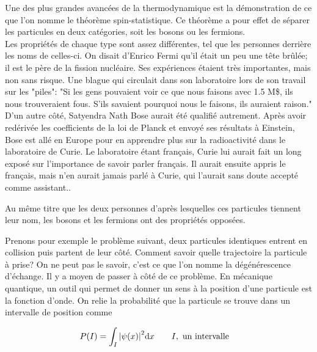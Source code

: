 

Une des plus grandes avancées de la thermodynamique est la démonstration de ce
que l'on nomme le théorème spin-statistique. Ce théorème a pour effet de
séparer les particules en deux catégories, soit les bosons ou les fermions.\\

Les propriétés de chaque type sont assez différentes, tel que les personnes
derrière les noms de celles-ci. On disait d'Enrico Fermi qu'il était un peu
une tête brûlée; il est le père de la fission nucléaire. Ses expériences étaient
très importantes, mais non sans risque. Une blague qui circulait dans son laboratoire
lors de son travail sur les "piles": "Si les gens pouvaient voir ce que nous
faisons avec 1.5 M\$, ils nous trouveraient fous. S'ils savaient pourquoi nous
le faisons, ils auraient raison."\cite{fermi1}\cite{fermi2}\\

D'un autre côté, Satyendra Nath Bose aurait été qualifié autrement. Après avoir
redérivée les coefficients de la loi de Planck et envoyé ses résultats à Einstein,
Bose est allé en Europe pour en apprendre plus sur la radioactivité dans le
laboratoire de Curie. Le laboratoire étant français, Curie lui aurait fait un
long exposé sur l'importance de savoir parler français. Il aurait ensuite appris
le français, mais n'en aurait jamais parlé à Curie, qui l'aurait sans doute accepté
comme assistant.\cite{bose1}\cite{bose2}.


Au même titre que les deux personnes d'après lesquelles ces particules tiennent
leur nom, les bosons et les fermions ont des propriétés opposées.

Prenons pour exemple le problème suivant, deux particules identiques entrent en collision
puis partent de leur côté. Comment savoir quelle trajectoire la particule à prise?
On ne peut pas le savoir, c'est ce que l'on nomme la dégénérescence d'échange\cite{senech}.
Il y a moyen de passer à côté de ce problème. En mécanique quantique, un outil
qui permet de donner un sens à la position d'une particule est la fonction
d'onde. On relie la probabilité que la particule se trouve dans un intervalle
de position comme

\begin{align}
    P(I)&=\int_I\abs{\psi(x)}^2\dd x\qquad I,\ \text{un intervalle}
\end{align}

